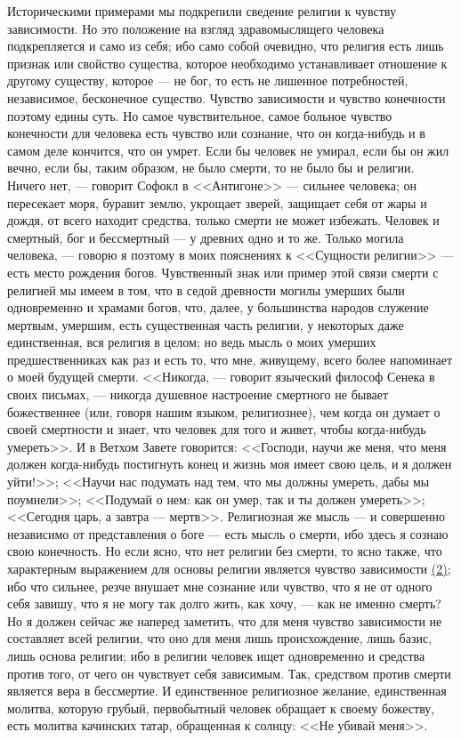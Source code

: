 \documentclass[12pt]{article}
\begin{document}
Историческими примерами мы подкрепили сведение религии к чувству зависимости. Но это положение на взгляд здравомыслящего человека подкрепляется и само из себя; ибо само собой очевидно, что религия есть лишь признак или свойство существа, которое необходимо устанавливает отношение к другому существу, которое --- не бог, то есть не лишенное потребностей, независимое, бесконечное существо. Чувство зависимости и чувство конечности поэтому едины суть. Но самое чувствительное, самое больное чувство конечности для человека есть чувство или сознание, что он когда-нибудь и в самом деле кончится, что он умрет. Если бы человек не умирал, если бы он жил вечно, если бы, таким образом, не было смерти, то не было бы и религии. Ничего нет, --- говорит Софокл в <<Антигоне>>  --- сильнее человека; он пересекает моря, буравит землю, укрощает зверей, защищает себя от жары и дождя, от всего находит средства, только смерти не может избежать. Человек и смертный, бог и бессмертный --- у древних одно и то же. Только могила человека, --- говорю я поэтому в моих пояснениях к <<Сущности религии>>  --- есть место рождения богов. Чувственный знак или пример этой связи смерти с религией мы имеем в том, что в седой древности могилы умерших были одновременно и храмами богов, что, далее, у большинства народов служение мертвым, умершим, есть существенная часть религии, у некоторых даже единственная, вся религия в целом; но ведь мысль о моих умерших предшественниках как раз и есть то, что мне, живущему, всего более напоминает о моей будущей смерти. <<Никогда, --- говорит языческий философ Сенека в своих письмах, --- никогда душевное настроение смертного не бывает божественнее (или, говоря нашим языком, религиознее), чем когда он думает о своей смертности и знает, что человек для того и живет, чтобы когда-нибудь умереть>>. И в Ветхом Завете говорится: <<Господи, научи же меня, что меня должен когда-нибудь постигнуть конец и жизнь моя имеет свою цель, и я должен уйти!>>;  <<Научи нас подумать над тем, что мы должны умереть, дабы мы поумнели>>;  <<Подумай о нем: как он умер, так и ты должен умереть>>;  <<Сегодня царь, а завтра --- мертв>>. Религиозная же мысль --- и совершенно независимо от представления о боге --- есть мысль о смерти, ибо здесь я сознаю свою конечность. Но если ясно, что нет религии без смерти, то ясно также, что характерным выражением для основы религии является чувство зависимости \hyperlink{2}{(2)}\hypertarget{b2}{}; ибо что сильнее, резче внушает мне сознание или чувство, что я не от одного себя завишу, что я не могу так долго жить, как хочу, --- как не именно смерть? Но я должен сейчас же наперед заметить, что для меня чувство зависимости не составляет всей религии, что оно для меня лишь происхождение, лишь базис, лишь основа религии; ибо в религии человек ищет одновременно и средства против того, от чего он чувствует себя зависимым. Так, средством против смерти является вера в бессмертие. И единственное религиозное желание, единственная молитва, которую грубый, первобытный человек обращает к своему божеству, есть молитва качинских татар, обращенная к солнцу: <<Не убивай меня>>.
\end{document}
